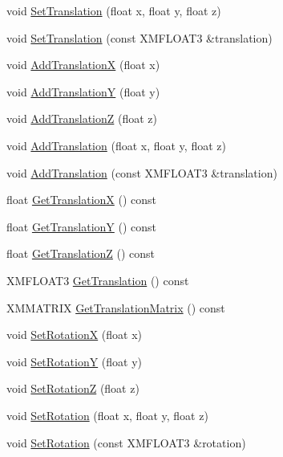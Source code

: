 \begin{DoxyCompactItemize}
void \hyperlink{structmage_1_1_transform_acf702bb57431be2986ca487e07189bda}{Set\+Translation} (float x, float y, float z)
\item 
void \hyperlink{structmage_1_1_transform_ad82e98f98d57cd3e9878336b6c3e804c}{Set\+Translation} (const X\+M\+F\+L\+O\+A\+T3 \&translation)
\item 
void \hyperlink{structmage_1_1_transform_aa4b8469fa07ab4ad3b50aaa34389967f}{Add\+TranslationX} (float x)
\item 
void \hyperlink{structmage_1_1_transform_aef8f3728f6d6d55e69689cff2af4c26f}{Add\+TranslationY} (float y)
\item 
void \hyperlink{structmage_1_1_transform_a0553f72a6fcf38128d2201d54584f079}{Add\+TranslationZ} (float z)
\item 
void \hyperlink{structmage_1_1_transform_a2e981e670eea4d731bda4ee68f0b7fae}{Add\+Translation} (float x, float y, float z)
\item 
void \hyperlink{structmage_1_1_transform_a1125e444c9537e09a328f37a47e61b58}{Add\+Translation} (const X\+M\+F\+L\+O\+A\+T3 \&translation)
\item 
float \hyperlink{structmage_1_1_transform_a171525f6ba157e319646548f2c459395}{Get\+TranslationX} () const
\item 
float \hyperlink{structmage_1_1_transform_a7feba3c1d24a986e440dd6571edc14b2}{Get\+TranslationY} () const
\item 
float \hyperlink{structmage_1_1_transform_a023ce9ea6afaaa80776b4d43957964bf}{Get\+TranslationZ} () const
\item 
X\+M\+F\+L\+O\+A\+T3 \hyperlink{structmage_1_1_transform_aca74308060f244adf137676e79a9f6e5}{Get\+Translation} () const
\item 
X\+M\+M\+A\+T\+R\+IX \hyperlink{structmage_1_1_transform_a4f246a50de8bdfd1bd9dd8e07b7a8c01}{Get\+Translation\+Matrix} () const
\item 
void \hyperlink{structmage_1_1_transform_ae526dabb395eea9481fc072624f6bec4}{Set\+RotationX} (float x)
\item 
void \hyperlink{structmage_1_1_transform_a95c83ba282bf84aeb1c49d9ba8242609}{Set\+RotationY} (float y)
\item 
void \hyperlink{structmage_1_1_transform_ac587047697f24d2279e7b4f5ab333f44}{Set\+RotationZ} (float z)
\item 
void \hyperlink{structmage_1_1_transform_a8e8fffa4ae9bc969196151daf4502421}{Set\+Rotation} (float x, float y, float z)
\item 
void \hyperlink{structmage_1_1_transform_a6b15a1591a10fe2984b7e8b0b8c92bd5}{Set\+Rotation} (const X\+M\+F\+L\+O\+A\+T3 \&rotation)

\end{DoxyCompactItemize}
